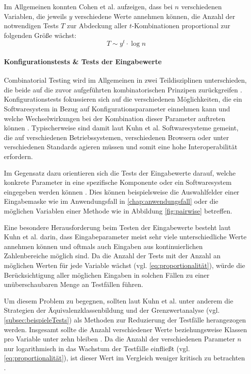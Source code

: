 Im Allgemeinen konnten Cohen et al. \cite{cohen1997aetg} aufzeigen, dass bei $n$ verschiedenen Variablen, die jeweils $y$ verschiedene Werte annehmen können, die Anzahl der notwendigen Tests $T$ zur Abdeckung aller $t$-Kombinationen proportional zur folgenden Größe wächst:
\begin{equation}\label{eq:proportionalität}
T \sim y^t \cdot \log n
\end{equation}

\paragraph{Konfigurationstests \& Tests der Eingabewerte}

Combinatorial Testing wird im Allgemeinen in zwei Teildisziplinen unterschieden, die beide auf die zuvor aufgeführten kombinatorischen Prinzipen zurückgreifen \cite{kuhn2010practical}. Konfigurationstests fokussieren sich auf die verschiedenen Möglichkeiten, die ein Softwaresystem in Bezug auf Konfigurationsparameter einnehmen kann und welche Wechselwirkungen bei der Kombination dieser Parameter auftreten können \cite{kuhn2010practical}. Typischerweise sind damit laut Kuhn et al. \cite{kuhn2010practical} Softwaresysteme gemeint, die auf verschiedenen Betriebssystemen, verschiedenen Browsern oder unter verschiedenen Standards agieren müssen und somit eine hohe Interoperabilität erfordern.

Im Gegensatz dazu orientieren sich die Tests der Eingabewerte darauf, welche konkrete Parameter in eine spezifische Komponente oder ein Softwaresystem eingegeben werden können \cite{kuhn2010practical}. Dies können beispielsweise die Auswahlfelder einer Eingabemaske wie im Anwendungsfall in \autoref{chap:anwendungsfall} oder die möglichen Variablen einer Methode wie in Abbildung \ref{fig:pairwise} betreffen. 

Eine besondere Herausforderung beim Testen der Eingabewerte besteht laut Kuhn et al. \cite{kuhn2010practical} darin, dass Eingabeparameter meist sehr viele unterschiedliche Werte annehmen können und oftmals auch Eingaben aus kontinuierlichen Zahlenbereiche möglich sind. Da die Anzahl der Tests mit der Anzahl an möglichen Werten für jede Variable wächst (vgl. \autoref{eq:proportionalität}), würde die Berücksichtigung aller möglichen Eingaben in solchen Fällen zu einer unüberschaubaren Menge an Testfällen führen. 

Um diesem Problem zu begegnen, sollten laut Kuhn et al. \cite{kuhn2010practical} unter anderem die Strategien der Äquivalenzklassenbildung und der Grenzwertanalyse (vgl. \autoref{subsec:beispieleTests}) als Methoden zur Reduzierung der Testfälle herangezogen werden. Insgesamt sollte die Anzahl verschiedener Werte beziehungsweise Klassen pro Variable unter zehn bleiben \cite{kuhn2010practical}. Da die Anzahl der verschiedenen Parameter $n$ nur logarithmisch in das Wachstum der Testfälle einfließt (vgl. \autoref{eq:proportionalität}), ist dieser Wert im Vergleich weniger kritisch zu betrachten \cite{kuhn2010practical}.


